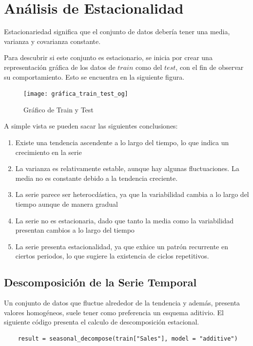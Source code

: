 \section{Análisis de Estacionalidad}

Estacionariedad significa que el conjunto de datos debería tener una media, varianza y covarianza constante.

Para descubrir si este conjunto es estacionario, se inicia por crear una representación gráfica de los datos de $train$ como del $test$, con el fin de observar su comportamiento. Esto se encuentra en la siguiente figura.


\begin{figure}[!h]
	\centering
	\texttt{[image: gráfica\_train\_test\_og]}
	\caption{Gráfico de Train y Test}
	\label{fig:graficatraintestog}
\end{figure}

A simple vista se pueden sacar las siguientes conclusiones:
\begin{enumerate}
	\item Existe una tendencia ascendente a lo largo del tiempo, lo que indica un crecimiento en la serie
	\item La varianza es relativamente estable, aunque hay algunas fluctuaciones. La media no es constante debido a la tendencia creciente.
	\item La serie parece ser heterocdástica, ya que la variabilidad cambia a lo largo del tiempo aunque de manera gradual
	\item La serie no es estacionaria, dado que tanto la media como la variabilidad presentan cambios a lo largo del tiempo
	\item La serie presenta estacionalidad, ya que exhice un patrón recurrente en ciertos periodos, lo que sugiere la existencia de ciclos repetitivos.
\end{enumerate}


\subsection{Descomposición de la Serie Temporal}

Un conjunto de datos que fluctue alrededor de la tendencia y además, presenta valores homogéneos, suele tener como preferencia un esquema aditivio.
El siguiente código presenta el calculo de descomposición estacional.
\begin{lstlisting}
	result = seasonal_decompose(train["Sales"], model = "additive")
\end{lstlisting}



